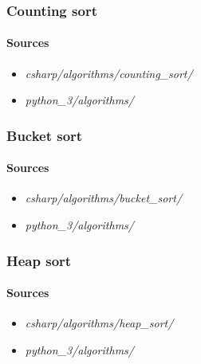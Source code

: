 \documentclass{article}
\begin{document}

\subsubsection{Counting sort}
\paragraph{Sources}
\begin{itemize}
\item{{\em csharp/algorithms/counting\_sort/}}
\item{{\em python\_3/algorithms/}}
\end{itemize}


\subsubsection{Bucket sort}
\paragraph{Sources}
\begin{itemize}
\item{{\em csharp/algorithms/bucket\_sort/}}
\item{{\em python\_3/algorithms/}}
\end{itemize}


\subsubsection{Heap sort}
\paragraph{Sources}
\begin{itemize}
\item{{\em csharp/algorithms/heap\_sort/}}
\item{{\em python\_3/algorithms/}}
\end{itemize}
\end{document}
